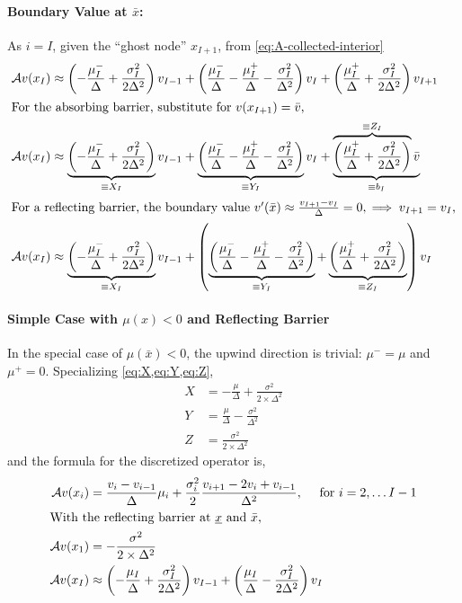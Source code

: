 \documentclass[11pt]{etk-article}
\begin{document}
\paragraph{Boundary Value at $\bar{x}$:}
As $i=I$, given the ``ghost node'' $x_{I+1}$, from \cref{eq:A-collected-interior}
\begin{align}
\mathcal{A} v(x_I)&\approx \left(-\frac{\mu_I^{-}}{\Delta} +\frac{\sigma_I^2}{2\Delta^2}\right)v_{I-1} + \left(\frac{\mu_I^{-}}{\Delta} - \frac{\mu_I^{+}}{\Delta}-\frac{\sigma_I^2}{\Delta^2}\right)v_I + \left(\frac{\mu_I^{+}}{\Delta} + \frac{\sigma_I^2}{2\Delta^2}\right)v_{I+1}\\
\intertext{For the absorbing barrier, substitute for $v(x_{I+1}) = \bar{v}$,}
\mathcal{A} v(x_I)&\approx \underbrace{\left(-\frac{\mu_I^{-}}{\Delta} +\frac{\sigma_I^2}{2\Delta^2}\right)}_{\equiv X_I} v_{I-1} + \underbrace{\left(\frac{\mu_I^{-}}{\Delta} - \frac{\mu_I^{+}}{\Delta}-\frac{\sigma_I^2}{\Delta^2}\right)}_{\equiv Y_I} v_I + \underbrace{\overbrace{\left(\frac{\mu_I^{+}}{\Delta} + \frac{\sigma_I^2}{2\Delta^2}\right)}^{\equiv Z_I}\bar{v}}_{\equiv b_I}\\
\intertext{For a reflecting barrier, the boundary value $v'(\bar{x}) \approx \frac{v_{I+1}-v_I}{\Delta} = 0, \implies v_{I+1} = v_I$,}
\mathcal{A} v(x_I)&\approx \underbrace{\left(-\frac{\mu_I^{-}}{\Delta} +\frac{\sigma_I^2}{2\Delta^2}\right)}_{\equiv X_I} v_{I-1} + \left(\underbrace{\left(\frac{\mu_I^{-}}{\Delta} - \frac{\mu_I^{+}}{\Delta}-\frac{\sigma_I^2}{\Delta^2}\right)}_{\equiv Y_I} + \underbrace{\left(\frac{\mu_I^{+}}{\Delta} + \frac{\sigma_I^2}{2\Delta^2}\right)}_{\equiv Z_I} \right) v_I 
\end{align}
\paragraph{Simple Case with $\mu(x) < 0$ and Reflecting Barrier}
In the special case of $\mu(\bar{x}) < 0$, the upwind direction is trivial: $\mu^{-} = \mu$ and $\mu^{+} = 0$.  Specializing \cref{eq:X,eq:Y,eq:Z},
\begin{align}
	X &= - \frac{\mu}{\Delta} + \frac{\sigma^{2}}{2\times \Delta^{2}}\label{eq:X-backwards} \\
	Y &= \frac{\mu}{\Delta} - \frac{\sigma^{2}}{\Delta^{2}}\label{eq:Y-backwards} \\
	Z &= \frac{\sigma^{2}}{2\times \Delta^{2}}\label{eq:Z-backwards}
\end{align}
and the formula for the discretized operator is,
\begin{align}
	\mathcal{A} v(x_i)  &= \frac{v_i-v_{i-1}}{\Delta}\mu_i + \frac{\sigma_i^2}{2} \frac{v_{i+1} - 2 v_i + v_{i-1}}{\Delta^2},\quad \text{ for } i = 2,\ldots I-1\\
	\intertext{With the reflecting barrier at $\underline{x}$ and $\bar{x}$,}
	\mathcal{A} v(x_1) &= -\frac{\sigma^{2}}{2\times \Delta^{2}}\\
\mathcal{A} v(x_I)&\approx \left(-\frac{\mu_I}{\Delta} +\frac{\sigma_I^2}{2\Delta^2}\right) v_{I-1} + \left(\frac{\mu_I}{\Delta} - \frac{\sigma_I^2}{2\Delta^2}\right) v_I 
\end{align}
\end{document}

